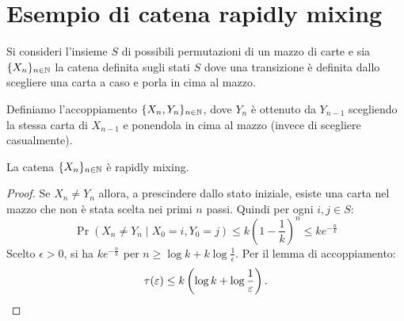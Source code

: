\section{Esempio di catena rapidly mixing}
Si consideri l'insieme $S$ di possibili permutazioni di un mazzo di carte e sia $\chain X$ la catena definita sugli stati $S$ dove una transizione è definita dallo scegliere una carta a caso e porla in cima al mazzo.

Definiamo l'accoppiamento $\{X_n,Y_n\}_{n\in\N}$, dove $Y_n$ è ottenuto da $Y_{n-1}$ scegliendo la stessa carta di $X_{n-1}$ e ponendola in cima al mazzo (invece di scegliere casualmente).

\begin{thm}
	La catena $\chain X$ è rapidly mixing.
\end{thm}
\begin{proof}
	Se $X_n\ne Y_n$ allora, a prescindere dallo stato iniziale, esiste una carta nel mazzo che non è stata scelta nei primi $n$ passi. Quindi per ogni $i,j\in S$:
	\begin{equation*}
		\Pr(X_n\ne Y_n\mid X_0=i,Y_0=j) \le k\left(1-\frac 1k\right)^n \le ke^{-\frac nk}
	\end{equation*}
	Scelto $\epsilon>0$, si ha $ke^{-\frac nk}$ per $n\ge \log k+k\log\frac{1}{\epsilon}$. Per il lemma di accoppiamento:
	\begin{equation*}
		\tau(\epsilon)\le k\left(\log k+\log\frac{1}{\epsilon}\right) \text. \qedhere
	\end{equation*}
\end{proof}
